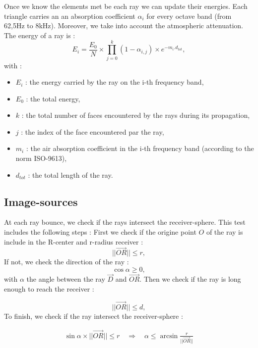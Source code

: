 \documentclass[AMA,STIX1COL]{WileyNJD-v2}
\begin{document}
Once we know the elements met be each ray we can update their energies. Each triangle carries an an absorption coefficient $\alpha_i$ for every octave band (from 62,5Hz to 8kHz). Moreover, we take into account the atmospheric attenuation. The energy of a ray is :
\begin{equation}
E_{i} =  \frac{E_0}{N} \times \prod_{j=0}^{k}{(1-\alpha_{i,j})} \times e^{-m_i . d_{tot}},
\end{equation}
with : 
\begin{itemize}
\item $E_{i}$ : the energy carried by the ray on the i-th frequency band,
\item $E_{0}$ : the total energy,
\item $k$ : the total number of faces encountered by the rays during its propagation,
\item $j$ : the index of the face encountered par the ray,
\item $m_i$ : the air absorption coefficient in the i-th frequency band (according to the norm ISO-9613),
\item $ d_{tot}$ : the total length of the ray.
\end{itemize}

\subsection{Image-sources}

At each ray bounce, we check if the rays intersect the receiver-sphere. This test includes the following steps :
First we check if the origine point $O$ of the ray is include in the R-center and r-radius receiver :
\begin{equation}
||\overrightarrow{OR}|| \leqslant r,
\end{equation}
%
If not, we check the direction of the ray :
\begin{equation}
\cos{\alpha} \geqslant 0,
\end{equation}
with $\alpha$ the angle between the ray $\overrightarrow{D}$ and $\overrightarrow{OR}$. Then we check if the ray is long enough to reach the receiver :

\begin{equation}
||\overrightarrow{OR}|| \leqslant d,
\end{equation}
%
To finish, we check if the ray intersect the receiver-sphere :

\begin{align}
\sin{\alpha} \times ||\overrightarrow{OR}||  \leqslant r 
\quad \Rightarrow \quad
\alpha  \leqslant \arcsin{\frac{r}{||\overrightarrow{OR}||}}
\end{align}
\end{document}
